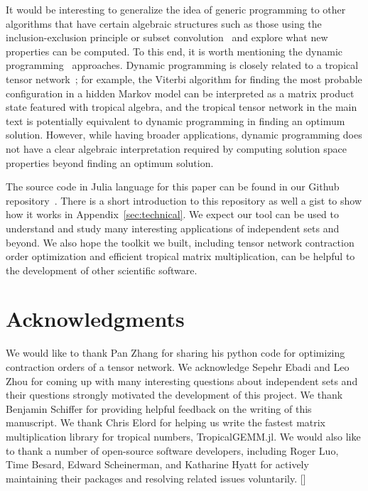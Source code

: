 \documentclass[onefignum, onetabnum]{siamart190516}
\newcommand{\<}{\langle}
\renewcommand{\>}{\rangle}
\newcommand{\blue}[1]{[{\bf  \color{blue}{JG: #1}}]}
\newcounter{example}
\begin{document}
It would be interesting to generalize the idea of generic programming to other algorithms that have certain algebraic structures such as those using the inclusion-exclusion principle or subset convolution~\cite{Fomin2013} and explore what new properties can be computed.
To this end, it is worth mentioning the dynamic programming~\cite{Courcelle1990, Fomin2013} approaches.
Dynamic programming is closely related to a tropical tensor network~\cite{Liu2021}; for example, the Viterbi algorithm for finding the most probable configuration in a hidden Markov model can be interpreted as a matrix product state featured with tropical algebra, and the tropical tensor network in the main text is potentially equivalent to dynamic programming in finding an optimum solution.
However, while having broader applications, dynamic programming does not have a clear algebraic interpretation required by computing solution space properties beyond finding an optimum solution.

The source code in Julia language for this paper can be found in our Github repository~\cite{GenericTensorNetworks}. 
There is a short introduction to this repository as well a gist to show how it works in Appendix~\ref{sec:technical}.
We expect our tool can be used to understand and study many interesting applications of independent sets and beyond.
We also hope the toolkit we built, including tensor network contraction order optimization and efficient tropical matrix multiplication, can be helpful to the development of other scientific software.


\section*{Acknowledgments}
We would like to thank Pan Zhang for sharing his python code for optimizing contraction orders of a tensor network.
We acknowledge Sepehr Ebadi and Leo Zhou for coming up with many interesting questions about independent sets and their questions strongly motivated the development of this project.
We thank Benjamin Schiffer for providing helpful feedback on the writing of this manuscript.
We thank Chris Elord for helping us write the fastest matrix multiplication library for tropical numbers, TropicalGEMM.jl. %
We would also like to thank a number of open-source software developers, including Roger Luo, Time Besard, Edward Scheinerman, and Katharine Hyatt
for actively maintaining their packages and resolving related issues voluntarily.
\blue{funding information, need to mention the AWS}
\end{document}

